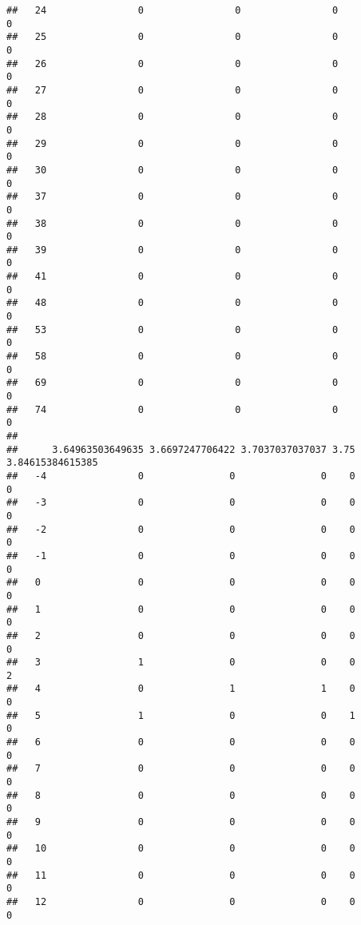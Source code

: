 \documentclass[]{article}
\begin{document}
\begin{verbatim}
##   24                0                0                0               0
##   25                0                0                0               0
##   26                0                0                0               0
##   27                0                0                0               0
##   28                0                0                0               0
##   29                0                0                0               0
##   30                0                0                0               0
##   37                0                0                0               0
##   38                0                0                0               0
##   39                0                0                0               0
##   41                0                0                0               0
##   48                0                0                0               0
##   53                0                0                0               0
##   58                0                0                0               0
##   69                0                0                0               0
##   74                0                0                0               0
##     
##      3.64963503649635 3.6697247706422 3.7037037037037 3.75 3.84615384615385
##   -4                0               0               0    0                0
##   -3                0               0               0    0                0
##   -2                0               0               0    0                0
##   -1                0               0               0    0                0
##   0                 0               0               0    0                0
##   1                 0               0               0    0                0
##   2                 0               0               0    0                0
##   3                 1               0               0    0                2
##   4                 0               1               1    0                0
##   5                 1               0               0    1                0
##   6                 0               0               0    0                0
##   7                 0               0               0    0                0
##   8                 0               0               0    0                0
##   9                 0               0               0    0                0
##   10                0               0               0    0                0
##   11                0               0               0    0                0
##   12                0               0               0    0                0

\end{verbatim}
\end{document}
